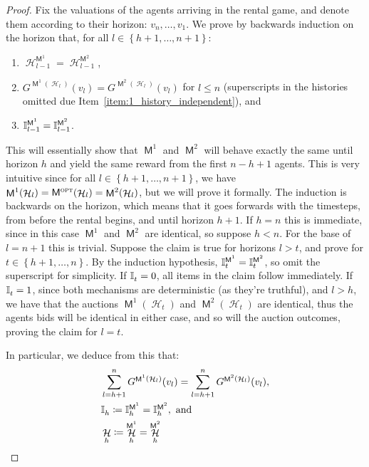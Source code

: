 \documentclass[11pt,letterpaper]{article}
\newcommand{\set}[1]{\left\{#1\right\}}
\DeclareMathOperator{\history}{\mathcal{H}}
\DeclareMathOperator{\M}{\mech{M}}
\newcommand{\sumof}[3]{\sum_{{#1}={#2}}^{#3}\limits}
\theoremstyle{plain}
\newcommand{\mech}[1]{\mathsf{#1}}
\begin{document}
\begin{proof}
     Fix the valuations of the agents arriving in the rental game, and denote them according to their horizon: $v_n,\dots,v_1$.      
     We prove by backwards induction on the horizon that, for all $l\in \set{h+1,\dots,n+1}$:
     \begin{enumerate}
         \item $\history^{\M^1}_{l-1}=\history^{\M^2}_{l-1}$,\label{item:1_history_independent}
         \item $G^{\M^1(\history_l)}(v_l)=G^{\M^2(\history_l)}(v_l)$ for $l\leq n$ (superscripts in the histories omitted due Item~\ref{item:1_history_independent}), and  \label{item:2_history_independent}
         \item $\ind[\M^1]{l-1}=\ind[\M^2]{l-1}$.\label{item:3_history_independent}
     \end{enumerate}

    This will essentially show that $\M^1$ and $\M^2$ will behave exactly the same until horizon $h$ and yield the same reward from the first $n-h+1$ agents. This is very intuitive since for all $l\in \set{h+1,\dots,n+1}$, we have $\M^1(\history_l)=\mopt(\history_l)=\M^2(\history_l)$, but we will prove it formally. The induction is backwards on the horizon, which means that it goes forwards with the timesteps, from before the rental begins, and until horizon $h+1$.
     If $h=n$ this is immediate, since in this case $\M^1$ and $\M^2$ are identical, so suppose $h<n$. For the base of  $l=n+1$ this is trivial.  Suppose the claim is true for horizons $l>t$, and prove for  $t\in \set{h+1,\dots,n}$. By the induction hypothesis, $\ind[\M^1]{t}=\ind[\M^2]{t}$, so omit the superscript for simplicity. If $\ind{t}=0$, all items in the claim follow immediately. If $\ind{t}=1$, since both mechanisms are deterministic (as they're truthful), and $l>h$, we have that the auctions $\M^1(\history_t)$ and $\M^2(\history_t)$ are identical, thus the agents bids will be identical in either case, and so will the auction outcomes, proving the claim for $l=t$.
     
    In particular, we deduce from this that:
    \begin{align}
        &\sumof{l}{h+1}{n}G^{\M^1(\history_l)}(v_l)=\sumof{l}{h+1}{n}G^{\M^2(\history_l)}(v_l),\label{eq:123}\\
        &\ind{h}\coloneq\ind[\M^1]{h}=\ind[\M^2]{h},\textnormal{ and}\\
        &\history_h\coloneq\history^{\M^1}_{h}=\history^{\M^2}_{h}
    \end{align}



\end{proof}
\end{document}
